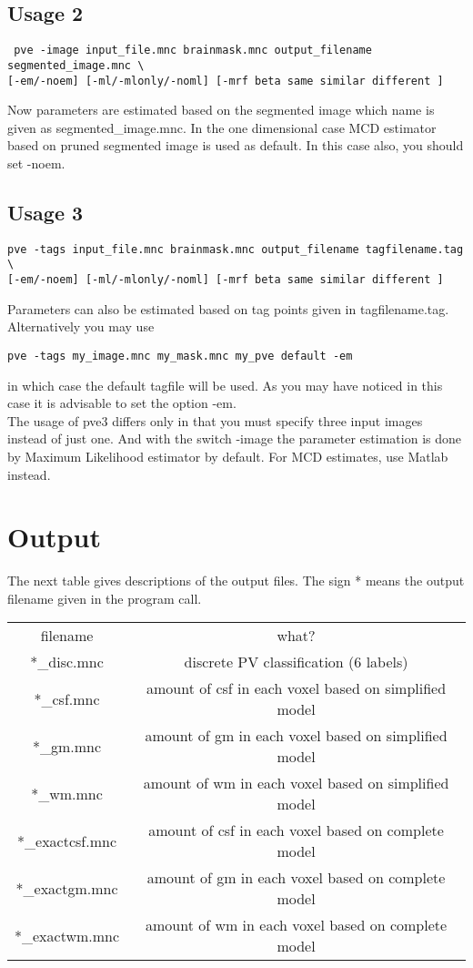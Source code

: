 \documentclass{article}
\begin{document}
\subsection*{Usage 2}

\begin{verbatim} 
 pve -image input_file.mnc brainmask.mnc output_filename segmented_image.mnc \ 
[-em/-noem] [-ml/-mlonly/-noml] [-mrf beta same similar different ]
\end{verbatim}
Now parameters are estimated based on the segmented image which name is
given as segmented\_image.mnc. In the one dimensional case MCD
estimator based on pruned segmented image is used as default. In this
case also, you should set -noem. 

\subsection*{Usage 3}
\begin{verbatim} 
pve -tags input_file.mnc brainmask.mnc output_filename tagfilename.tag \
[-em/-noem] [-ml/-mlonly/-noml] [-mrf beta same similar different ]
\end{verbatim}
Parameters can also be estimated based on tag points given in
tagfilename.tag. Alternatively you may use
\begin{verbatim} 
pve -tags my_image.mnc my_mask.mnc my_pve default -em
\end{verbatim}
in which case the default tagfile will be used. As you may have
noticed in this case it is advisable to set the option -em.\\


The usage of pve3 differs only in that you must specify three input
images instead of just one. And with the switch -image the parameter
estimation is done by Maximum Likelihood estimator by default. For MCD 
estimates, use Matlab instead.

\section{Output}
The next table gives descriptions of the output files. The sign *
means the output filename given in the program call. 
\begin{center}
\begin{tabular}{c|c}
filename & what? \\
*\_disc.mnc     & discrete PV classification (6 labels) \\
*\_csf.mnc      & amount of csf in each voxel based on simplified model \\
*\_gm.mnc       & amount of gm in each voxel  based on simplified model \\
*\_wm.mnc       & amount of wm in each voxel  based on simplified model \\
*\_exactcsf.mnc & amount of csf in each voxel based on complete model \\
*\_exactgm.mnc  &  amount of gm in each voxel based on complete model \\
*\_exactwm.mnc  &  amount of wm in each voxel based on complete model \\
\end{tabular}
\end{center}
\end{document}
